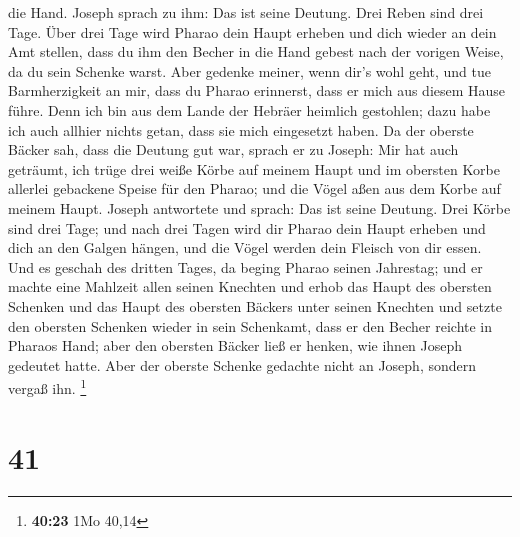 die Hand.  Joseph sprach zu ihm: Das ist seine Deutung.
Drei Reben sind drei Tage.  Über drei Tage wird Pharao dein
Haupt erheben und dich wieder an dein Amt stellen, dass du ihm den
Becher in die Hand gebest nach der vorigen Weise, da du sein Schenke
warst.  Aber gedenke meiner, wenn dir's wohl geht, und tue
Barmherzigkeit an mir, dass du Pharao erinnerst, dass er mich aus diesem
Hause führe.  Denn ich bin aus dem Lande der Hebräer
heimlich gestohlen; dazu habe ich auch allhier nichts getan, dass sie
mich eingesetzt haben.  Da der oberste Bäcker sah, dass die
Deutung gut war, sprach er zu Joseph: Mir hat auch geträumt, ich trüge
drei weiße Körbe auf meinem Haupt  und im obersten Korbe
allerlei gebackene Speise für den Pharao; und die Vögel aßen aus dem
Korbe auf meinem Haupt.  Joseph antwortete und sprach: Das
ist seine Deutung. Drei Körbe sind drei Tage;  und nach
drei Tagen wird dir Pharao dein Haupt erheben und dich an den Galgen
hängen, und die Vögel werden dein Fleisch von dir essen. 
Und es geschah des dritten Tages, da beging Pharao seinen Jahrestag; und
er machte eine Mahlzeit allen seinen Knechten und erhob das Haupt des
obersten Schenken und das Haupt des obersten Bäckers unter seinen
Knechten  und setzte den obersten Schenken wieder in sein
Schenkamt, dass er den Becher reichte in Pharaos Hand; 
aber den obersten Bäcker ließ er henken, wie ihnen Joseph gedeutet
hatte.  Aber der oberste Schenke gedachte nicht an Joseph,
sondern vergaß ihn. \footnote{\textbf{40:23} 1Mo 40,14}

\hypertarget{section-9}{%
\section{41}\label{section-9}}

